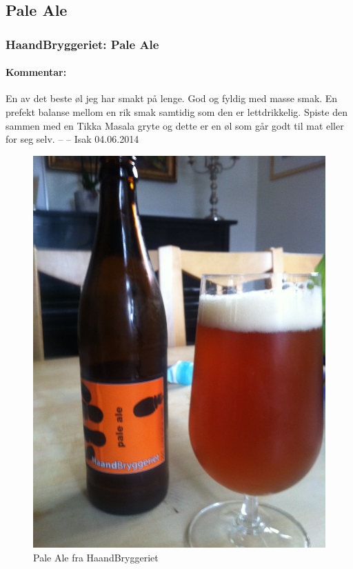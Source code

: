 \documentclass[12pt,a4paper,oneside,norsk]{article}
\begin{document}
\newpage
\subsection{Pale Ale}
\subsubsection{HaandBryggeriet: Pale Ale}
\paragraph{Kommentar:} En av det beste øl jeg har smakt på lenge. God og fyldig med masse smak. En prefekt balanse mellom en rik smak samtidig som den er lettdrikkelig. Spiste den sammen med en Tikka Masala gryte og dette er en øl som går godt til mat eller for seg selv.
\newline
-- -- Isak 04.06.2014

\begin{figure} [H]
\centering
\includegraphics[scale=0.1, angle=270]{Bilder/Ol/palealehaand}
\caption{Pale Ale fra HaandBryggeriet}
\end{figure}
\end{document}
